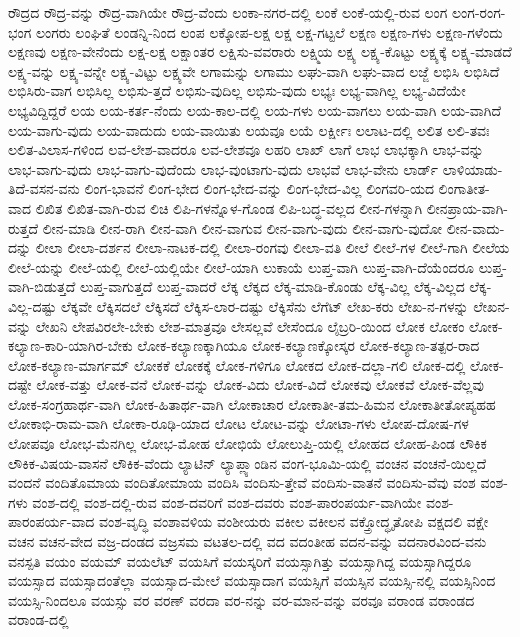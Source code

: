 {ರೌದ್ರದ
ರೌದ್ರ-ವನ್ನು
ರೌದ್ರ-ವಾಗಿಯೇ
ರೌದ್ರ-ವೆಂದು
ಲಂಕಾ-ನಗರ-ದಲ್ಲಿ
ಲಂಕೆ
ಲಂಕೆ-ಯಲ್ಲಿ-ರುವ
ಲಂಗ
ಲಂಗ-ರಂಗ-ಭಂಗ
ಲಂಗರು
ಲಂಘಿತೆ
ಲಂಡನ್ನಿ-ನಿಂದ
ಲಂಪ
ಲಕ್ಕೋಪ-ಲಕ್ಷ
ಲಕ್ಷ
ಲಕ್ಷ-ಗಟ್ಟಲೆ
ಲಕ್ಷಣ
ಲಕ್ಷಣ-ಗಳು
ಲಕ್ಷಣ-ಗಳೆಂದು
ಲಕ್ಷಣವು
ಲಕ್ಷಣ-ವೇನೆಂದು
ಲಕ್ಷ-ಲಕ್ಷ
ಲಕ್ಷಾಂತರ
ಲಕ್ಷಿಸು-ವವರಾರು
ಲಕ್ಷ್ಮಿಯ
ಲಕ್ಷ್ಯ
ಲಕ್ಷ್ಯ-ಕೊಟ್ಟು
ಲಕ್ಷ್ಯಕ್ಕೆ
ಲಕ್ಷ್ಯ-ಮಾಡದೆ
ಲಕ್ಷ್ಯ-ವನ್ನು
ಲಕ್ಷ್ಯ-ವನ್ನೇ
ಲಕ್ಷ್ಯ-ವಿಟ್ಟು
ಲಕ್ಷ್ಯವೇ
ಲಗಾಮನ್ನು
ಲಗಾಮು
ಲಘು-ವಾಗಿ
ಲಘು-ವಾದ
ಲಜ್ಜೆ
ಲಭಿಸಿ
ಲಭಿಸಿದೆ
ಲಭಿಸಿರು-ವಾಗ
ಲಭಿಸಿಲ್ಲ
ಲಭಿಸು-ತ್ತದೆ
ಲಭಿಸು-ವುದಿಲ್ಲ
ಲಭಿಸು-ವುದು
ಲಭ್ಯಃ
ಲಭ್ಯ-ವಾಗಿಲ್ಲ
ಲಭ್ಯ-ವಿದೆಯೇ
ಲಭ್ಯವಿದ್ದಿದ್ದರೆ
ಲಯ
ಲಯ-ಕರ್ತ-ನೆಂದು
ಲಯ-ಕಾಲ-ದಲ್ಲಿ
ಲಯ-ಗಳು
ಲಯ-ವಾಗಲು
ಲಯ-ವಾಗಿ
ಲಯ-ವಾಗಿದೆ
ಲಯ-ವಾಗು-ವುದು
ಲಯ-ವಾದುದು
ಲಯ-ವಾಯಿತು
ಲಯವೂ
ಲಯೆ
ಲರ್ಕ್ಷೀಃ
ಲಲಾಟ-ದಲ್ಲಿ
ಲಲಿತ
ಲಲಿ-ತವಃ
ಲಲಿತ-ವಿಲಾಸ-ಗಳಿಂದ
ಲವ-ಲೇಶ-ವಾದರೂ
ಲವ-ಲೇಶವೂ
ಲಹರಿ
ಲಾಖ್
ಲಾಗೆ
ಲಾಭ
ಲಾಭಕ್ಕಾಗಿ
ಲಾಭ-ವನ್ನು
ಲಾಭ-ವಾಗು-ವುದು
ಲಾಭ-ವಾಗು-ವುದೆಂದು
ಲಾಭ-ವುಂಟಾಗು-ವುದು
ಲಾಭವೆ
ಲಾಭ-ವೇನು
ಲಾರ್ಡ್
ಲಾಳಿಯಾಡು-ತಿದೆ-ವಸನ-ವನು
ಲಿಂಗ-ಭಾವನೆ
ಲಿಂಗ-ಭೇದ
ಲಿಂಗ-ಭೇದ-ವನ್ನು
ಲಿಂಗ-ಭೇದ-ವಿಲ್ಲ
ಲಿಂಗವರಿ-ಯದ
ಲಿಂಗಾತೀತ-ವಾದ
ಲಿಖಿತ
ಲಿಖಿತ-ವಾಗಿ-ರುವ
ಲಿಚಿ
ಲಿಪಿ-ಗಳನ್ನೊಳ-ಗೊಂಡ
ಲಿಪಿ-ಬದ್ಧ-ವಲ್ಲದ
ಲೀನ-ಗಳನ್ನಾಗಿ
ಲೀನಪ್ರಾಯ-ವಾಗಿ-ರುತ್ತದೆ
ಲೀನ-ಮಾಡಿ
ಲೀನ-ರಾಗಿ
ಲೀನ-ವಾಗಿ
ಲೀನ-ವಾಗುವ
ಲೀನ-ವಾಗು-ವುದು
ಲೀನ-ವಾಗು-ವುದೋ
ಲೀನ-ವಾದು-ದನ್ನು
ಲೀಲಾ
ಲೀಲಾ-ದರ್ಶನ
ಲೀಲಾ-ನಾಟಕ-ದಲ್ಲಿ
ಲೀಲಾ-ರಂಗವು
ಲೀಲಾ-ವತಿ
ಲೀಲೆ
ಲೀಲೆ-ಗಳ
ಲೀಲೆ-ಗಾಗಿ
ಲೀಲೆಯ
ಲೀಲೆ-ಯನ್ನು
ಲೀಲೆ-ಯಲ್ಲಿ
ಲೀಲೆ-ಯಲ್ಲಿಯೇ
ಲೀಲೆ-ಯಾಗಿ
ಲುಕಾಯೆ
ಲುಪ್ತ-ವಾಗಿ
ಲುಪ್ತ-ವಾಗಿ-ದೆಯೆಂದರೂ
ಲುಪ್ತ-ವಾಗಿ-ಬಿಡುತ್ತದೆ
ಲುಪ್ತ-ವಾಗುತ್ತದೆ
ಲುಪ್ತ-ವಾದರೆ
ಲೆಕ್ಕ
ಲೆಕ್ಕದ
ಲೆಕ್ಕ-ಮಾಡಿ-ಕೊಂಡು
ಲೆಕ್ಕ-ವಿಲ್ಲ
ಲೆಕ್ಕ-ವಿಲ್ಲದ
ಲೆಕ್ಕ-ವಿಲ್ಲ-ದಷ್ಟು
ಲೆಕ್ಕವೇ
ಲೆಕ್ಕಿಸದಲೆ
ಲೆಕ್ಕಿಸದೆ
ಲೆಕ್ಕಿಸ-ಲಾರ-ದಷ್ಟು
ಲೆಕ್ಕಿಸೆನು
ಲೆಗೆಟ್
ಲೇಖ-ಕರು
ಲೇಖ-ನ-ಗಳನ್ನು
ಲೇಖನ-ವನ್ನು
ಲೇಖನಿ
ಲೇಪವಿರಲೇ-ಬೇಕು
ಲೇಶ-ಮಾತ್ರವೂ
ಲೇಸಲ್ಲವೆ
ಲೇಸೆಂದೂ
ಲೈಬ್ರರಿ-ಯಿಂದ
ಲೋಕ
ಲೋಕಂ
ಲೋಕ-ಕಲ್ಯಾಣ-ಕಾರಿ-ಯಾಗಿರ-ಬೇಕು
ಲೋಕ-ಕಲ್ಯಾಣಕ್ಕಾಗಿಯೂ
ಲೋಕ-ಕಲ್ಯಾಣಕ್ಕೋಸ್ಕರ
ಲೋಕ-ಕಲ್ಯಾಣ-ತತ್ಪರ-ರಾದ
ಲೋಕ-ಕಲ್ಯಾಣ-ಮಾರ್ಗಮ್
ಲೋಕಕೆ
ಲೋಕಕ್ಕೆ
ಲೋಕ-ಗಳಿಗೂ
ಲೋಕದ
ಲೋಕ-ದಲ್ಲಾ-ಗಲಿ
ಲೋಕ-ದಲ್ಲಿ
ಲೋಕ-ದಷ್ಟೇ
ಲೋಕ-ವತ್ತು
ಲೋಕ-ವನೆ
ಲೋಕ-ವನ್ನು
ಲೋಕ-ವಿದು
ಲೋಕ-ವಿದೆ
ಲೋಕವು
ಲೋಕವೆ
ಲೋಕ-ವೆಲ್ಲವು
ಲೋಕ-ಸಂಗ್ರಹಾರ್ಥ-ವಾಗಿ
ಲೋಕ-ಹಿತಾರ್ಥ-ವಾಗಿ
ಲೋಕಾಚಾರ
ಲೋಕಾತೀ-ತಮ-ಹಿಮನ
ಲೋಕಾತೀತೋಪ್ಯಹಹ
ಲೋಕಾಭಿ-ರಾಮ-ವಾಗಿ
ಲೋಕಾ-ರೂಢಿ-ಯಾದ
ಲೋಟ
ಲೋಟ-ವನ್ನು
ಲೋಟಾ-ಗಳು
ಲೋಪ-ದೋಷ-ಗಳ
ಲೋಪವೂ
ಲೋಭ-ಮೆನಗಿಲ್ಲ
ಲೋಭ-ಮೋಹ
ಲೋಭಿಯೆ
ಲೋಲುಪ್ತಿ-ಯಲ್ಲಿ
ಲೋಹದ
ಲೋಹ-ಪಿಂಡ
ಲೌಕಿಕ
ಲೌಕಿಕ-ವಿಷಯ-ವಾಸನೆ
ಲೌಕಿಕ-ವೆಂದು
ಲ್ಯಾಟಿನ್
ಲ್ಯಾಪ್ಲ್ಯಾಂಡಿನ
ವಂಗ-ಭೂಮಿ-ಯಲ್ಲಿ
ವಂಚನ
ವಂಚನೆ-ಯಿಲ್ಲದೆ
ವಂದನೆ
ವಂದಿತೊಮಾಯ
ವಂದಿತೋಮಾಯ
ವಂದಿಸಿ
ವಂದಿಸು-ತ್ತೇವೆ
ವಂದಿಸು-ವಾತನೆ
ವಂದಿಸು-ವೆವು
ವಂಶ
ವಂಶ-ಗಳು
ವಂಶ-ದಲ್ಲಿ
ವಂಶ-ದಲ್ಲಿ-ರುವ
ವಂಶ-ದವರಿಗೆ
ವಂಶ-ದವರು
ವಂಶ-ಪಾರಂಪರ್ಯ-ವಾಗಿಯೇ
ವಂಶ-ಪಾರಂಪರ್ಯ-ವಾದ
ವಂಶ-ವೃದ್ಧಿ
ವಂಶಾವಳಿಯ
ವಂಶೀಯರು
ವಕೀಲ
ವಕೀಲನ
ವಕ್ತ್ರೋದ್ಧೃತೋಪಿ
ವಕ್ಷದಲಿ
ವಕ್ಷೇ
ವಚನ
ವಚನ-ವೇದ
ವಜ್ರ-ದಂಡದ
ವಜ್ರಸಮ
ವಟತಲ-ದಲ್ಲಿ
ವದ
ವದಂತೀಹ
ವದನ-ವನ್ನು
ವದನಾರವಿಂದ-ವನು
ವನಸ್ಪತಿ
ವಯಂ
ವಯಮ್
ವಯಲೆಟ್
ವಯಸಿಗೆ
ವಯಸ್ಕರಿಗೆ
ವಯಸ್ಸಾಗಿತ್ತು
ವಯಸ್ಸಾಗಿದ್ದ
ವಯಸ್ಸಾಗಿದ್ದರೂ
ವಯಸ್ಸಾದ
ವಯಸ್ಸಾದಂತೆಲ್ಲಾ
ವಯಸ್ಸಾದ-ಮೇಲೆ
ವಯಸ್ಸಾದಾಗ
ವಯಸ್ಸಿಗೆ
ವಯಸ್ಸಿನ
ವಯಸ್ಸಿ-ನಲ್ಲಿ
ವಯಸ್ಸಿನಿಂದ
ವಯಸ್ಸಿ-ನಿಂದಲೂ
ವಯಸ್ಸು
ವರ
ವರಣ್
ವರದಾ
ವರ-ನನ್ನು
ವರ-ಮಾನ-ವನ್ನು
ವರವೂ
ವರಾಂಡ
ವರಾಂಡದ
ವರಾಂಡ-ದಲ್ಲಿ
}
